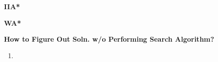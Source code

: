 


\begin{example} \textbf{IIA*}
    
\end{example}

\begin{example} \textbf{WA*}
    
\end{example}
\newpage

\begin{process} \textbf{How to Figure Out Soln. w/o Performing Search Algorithm?}
    \begin{enumerate}
        \item 
    \end{enumerate}
\end{process}

\begin{example} 
    
\end{example}
\newpage

